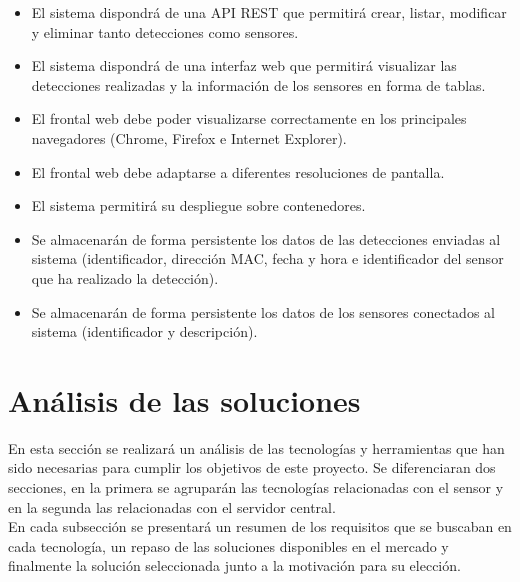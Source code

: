 \documentclass[../proyecto.tex]{subfiles}
\begin{document}
\begin{itemize}
  \item El sistema dispondrá de una API REST que permitirá crear, listar, modificar y eliminar tanto detecciones como sensores.
  \item El sistema dispondrá de una interfaz web que permitirá visualizar las detecciones realizadas y la información de los sensores en forma de tablas.
\end{itemize}

\begin{itemize}
  \item El frontal web debe poder visualizarse correctamente en los principales navegadores (Chrome, Firefox e Internet Explorer).
  \item El frontal web debe adaptarse a diferentes resoluciones de pantalla.
  \item El sistema permitirá su despliegue sobre contenedores.
\end{itemize}


\begin{itemize}
  \item Se almacenarán de forma persistente los datos de las detecciones enviadas al sistema (identificador, dirección MAC, fecha y hora e identificador del sensor que ha realizado la detección).
  \item Se almacenarán de forma persistente los datos de los sensores conectados al sistema (identificador y descripción).
\end{itemize}


\section{Análisis de las soluciones}\label{sect:analisis_soluciones}
En esta sección se realizará un análisis de las tecnologías y herramientas que han sido necesarias para cumplir los objetivos de este proyecto. Se diferenciaran dos secciones, en la primera se agruparán las tecnologías relacionadas con el sensor y en la segunda las relacionadas con el servidor central.\\

En cada subsección se presentará un resumen de los requisitos que se buscaban en cada tecnología, un repaso de las soluciones disponibles en el mercado y finalmente la solución seleccionada junto a la motivación para su elección.\\
\end{document}
